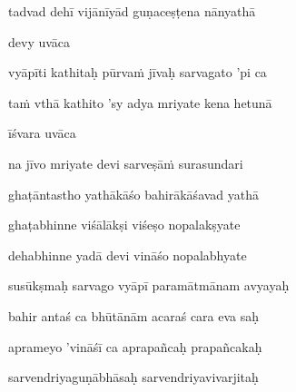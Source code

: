 tadvad dehī vijānīyād guṇaceṣṭena nānyathā \veg\dontdisplaylinenum

devy uvāca~{\dandab}\dontdisplaylinenum 

vyāpīti kathitaḥ pūrva\.m jīvaḥ sarvagato 'pi ca\thinspace{\danda} \dontdisplaylinenum

ta\.m vthā kathito 'sy adya mriyate kena hetunā \veg\dontdisplaylinenum

īśvara uvāca~{\dandab}\dontdisplaylinenum 

na jīvo mriyate devi sarveṣā\.m surasundari\thinspace{\danda} \dontdisplaylinenum

ghaṭāntastho yathākāśo bahirākāśavad yathā \veg\dontdisplaylinenum

ghaṭabhinne viśālākṣi viśeṣo nopalakṣyate\thinspace{\dandab} \dontdisplaylinenum

dehabhinne yadā devi vināśo nopalabhyate \veg\dontdisplaylinenum

susūkṣmaḥ sarvago vyāpī paramātmānam avyayaḥ\thinspace{\dandab} \dontdisplaylinenum

bahir antaś ca bhūtānām acaraś cara eva saḥ \veg\dontdisplaylinenum

aprameyo 'vināśī ca aprapañcaḥ prapañcakaḥ\thinspace{\dandab} \dontdisplaylinenum
            \var{\vab \om\ \msNb}%

sarvendriyaguṇābhāsaḥ sarvendriyavivarjitaḥ \veg\dontdisplaylinenum


